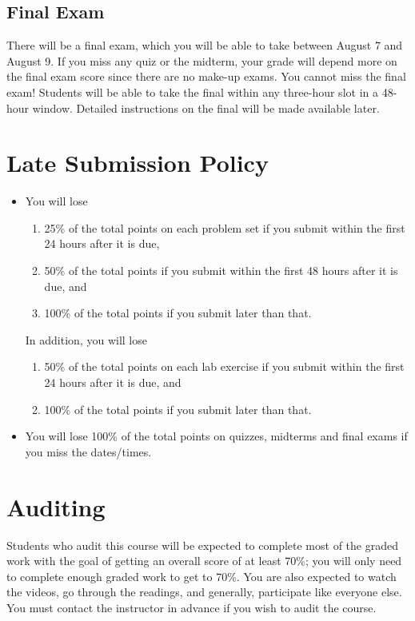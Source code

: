\documentclass[11pt, a4paper]{article}
\begin{document}
\subsection{Final Exam}
There will be a final exam, which you will be able to take between August 7 and August 9. If you miss any quiz or the midterm, your grade will depend more on the final exam score since there are no make-up exams. You cannot miss the final exam! Students will be able to take the final within any three-hour slot in a 48-hour window. Detailed instructions on the final will be made available later.


\section{Late Submission Policy} 
\begin{itemize}
	\item You will lose
	\begin{enumerate}
		\item 25\% of the total points on each problem set if you submit within the first 24 hours after it is due, 
		\item 50\% of the total points if you submit within the first 48 hours after it is due, and
		\item 100\% of the total points if you submit later than that.
	\end{enumerate}
	
	In addition, you will lose 
	\begin{enumerate}
		\item 50\% of the total points on each lab exercise if you submit within the first 24 hours after it is due, and
		\item 100\% of the total points if you submit later than that.
	\end{enumerate}
	
	\item You will lose 100\% of the total points on quizzes, midterms and final exams if you miss the dates/times.
\end{itemize}


\section{Auditing}
Students who audit this course will be expected to complete most of the graded work with the goal of getting an overall score of at least 70\%; you will only need to complete enough graded work to get to 70\%. You are also expected to watch the videos, go through the readings, and generally, participate like everyone else. You must contact the instructor in advance if you wish to audit the course.
\end{document}
